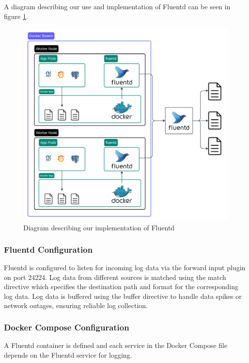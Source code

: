 A diagram describing our use and implementation of Fluentd can be seen in figure \ref{fig:logging2}.
\begin{figure}[H]
	\centering
	\includegraphics[width=1\textwidth]{Logging2.png}
	\caption{Diagram describing our implementation of Fluentd}
	\label{fig:logging2}
\end{figure}

\subsubsection*{Fluentd Configuration}

Fluentd is configured to listen for incoming log data via the forward input plugin on port 24224.
Log data from different sources is matched using the match directive which specifies the destination path and format for the corresponding log data.
Log data is buffered using the buffer directive to handle data spikes or network outages, ensuring reliable log collection.

\subsubsection*{Docker Compose Configuration}

A Fluentd container is defined %
and each service in the Docker Compose file depends on the Fluentd service for logging.

